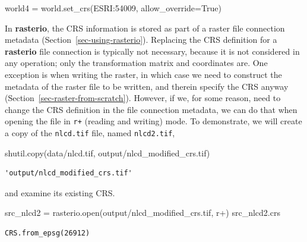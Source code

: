 \documentclass[
  letterpaper,
]{krantz}
\newenvironment{Shaded}{\begin{snugshade}}{\end{snugshade}}
\newcommand{\BuiltInTok}[1]{\textcolor[rgb]{0.00,0.23,0.31}{#1}}
\newcommand{\NormalTok}[1]{\textcolor[rgb]{0.00,0.23,0.31}{#1}}
\newcommand{\OperatorTok}[1]{\textcolor[rgb]{0.37,0.37,0.37}{#1}}
\newcommand{\StringTok}[1]{\textcolor[rgb]{0.13,0.47,0.30}{#1}}
\newcommand{\VariableTok}[1]{\textcolor[rgb]{0.07,0.07,0.07}{#1}}
\begin{document}
\begin{Shaded}
\begin{Highlighting}[]
\NormalTok{world4 }\OperatorTok{=}\NormalTok{ world.set\_crs(}\StringTok{\textquotesingle{}ESRI:54009\textquotesingle{}}\NormalTok{, allow\_override}\OperatorTok{=}\VariableTok{True}\NormalTok{)}
\end{Highlighting}
\end{Shaded}

In \textbf{rasterio}, the CRS information is stored as part of a raster
file connection metadata (Section~\ref{sec-using-rasterio}). Replacing
the CRS definition for a \textbf{rasterio} file connection is typically
not necessary, because it is not considered in any operation; only the
transformation matrix and coordinates are. One exception is when writing
the raster, in which case we need to construct the metadata of the
raster file to be written, and therein specify the CRS anyway
(Section~\ref{sec-raster-from-scratch}). However, if we, for some
reason, need to change the CRS definition in the file connection
metadata, we can do that when opening the file in \texttt{r+} (reading
and writing) mode. To demonstrate, we will create a copy of the
\texttt{nlcd.tif} file, named \texttt{nlcd2.tif},

\begin{Shaded}
\begin{Highlighting}[]
\NormalTok{shutil.copy(}\StringTok{\textquotesingle{}data/nlcd.tif\textquotesingle{}}\NormalTok{, }\StringTok{\textquotesingle{}output/nlcd\_modified\_crs.tif\textquotesingle{}}\NormalTok{)}
\end{Highlighting}
\end{Shaded}

\begin{verbatim}
'output/nlcd_modified_crs.tif'
\end{verbatim}

and examine its existing CRS.

\begin{Shaded}
\begin{Highlighting}[]
\NormalTok{src\_nlcd2 }\OperatorTok{=}\NormalTok{ rasterio.}\BuiltInTok{open}\NormalTok{(}\StringTok{\textquotesingle{}output/nlcd\_modified\_crs.tif\textquotesingle{}}\NormalTok{, }\StringTok{\textquotesingle{}r+\textquotesingle{}}\NormalTok{)}
\NormalTok{src\_nlcd2.crs}
\end{Highlighting}
\end{Shaded}

\begin{verbatim}
CRS.from_epsg(26912)
\end{verbatim}
\end{document}
